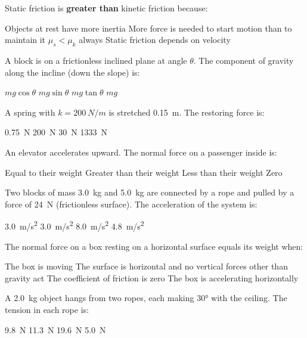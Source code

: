 \documentclass[addpoints]{exam}
\begin{document}
\begin{questions}
\question[1] Static friction is \textbf{greater than} kinetic friction because:
\begin{choices}
    \choice Objects at rest have more inertia
    \correctchoice More force is needed to start motion than to maintain it
    \choice $\mu_s < \mu_k$ always
    \choice Static friction depends on velocity
\end{choices}

\question[1] A block is on a frictionless inclined plane at angle $\theta$. The component
of gravity along the incline (down the slope) is:
\begin{choices}
    \choice $mg\cos\theta$
    \correctchoice $mg\sin\theta$
    \choice $mg\tan\theta$
    \choice $mg$
\end{choices}

\question[1] A spring with $k = \SI{200}{N/m}$ is stretched \SI{0.15}{m}. The restoring
force is:
\begin{choices}
    \choice \SI{0.75}{N}
    \choice \SI{200}{N}
    \correctchoice \SI{30}{N}
    \choice \SI{1333}{N}
\end{choices}

\question[1] An elevator accelerates upward. The normal force on a passenger inside is:
\begin{choices}
    \choice Equal to their weight
    \correctchoice Greater than their weight
    \choice Less than their weight
    \choice Zero
\end{choices}

\question[1] Two blocks of mass \SI{3.0}{kg} and \SI{5.0}{kg} are connected by a rope
and pulled by a force of \SI{24}{N} (frictionless surface). The acceleration of the system is:
\begin{choices}
    \choice \SI{3.0}{m/s^2}
    \correctchoice \SI{3.0}{m/s^2}
    \choice \SI{8.0}{m/s^2}
    \choice \SI{4.8}{m/s^2}
\end{choices}

\question[1] The normal force on a box resting on a horizontal surface equals its weight
when:
\begin{choices}
    \choice The box is moving
    \correctchoice The surface is horizontal and no vertical forces other than gravity act
    \choice The coefficient of friction is zero
    \choice The box is accelerating horizontally
\end{choices}

\question[1] A \SI{2.0}{kg} object hangs from two ropes, each making \ang{30} with the
ceiling. The tension in each rope is:
\begin{choices}
    \choice \SI{9.8}{N}
    \correctchoice \SI{11.3}{N}
    \choice \SI{19.6}{N}
    \choice \SI{5.0}{N}
\end{choices}


\end{questions}
\end{document}
